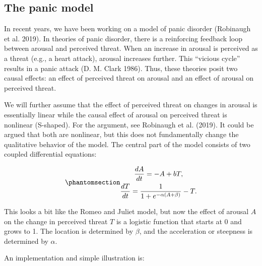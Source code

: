\documentclass[
  a4paper,
  DIV=11,
  numbers=noendperiod,
  oneside]{scrreprt}
\begin{document}
\subsection{The panic model}\label{sec-The-panic-model}

In recent years, we have been working on a model of panic disorder
(Robinaugh et al. 2019). In theories of panic disorder, there is a
reinforcing feedback loop between arousal and perceived threat. When an
increase in arousal is perceived as a threat (e.g., a heart attack),
arousal increases further. This ``vicious cycle'' results in a panic
attack (D. M. Clark 1986). Thus, these theories posit two causal
effects: an effect of perceived threat on arousal and an effect of
arousal on perceived threat.

We will further assume that the effect of perceived threat on changes in
arousal is essentially linear while the causal effect of arousal on
perceived threat is nonlinear (S-shaped). For the argument, see
Robinaugh et al. (2019). It could be argued that both are nonlinear, but
this does not fundamentally change the qualitative behavior of the
model. The central part of the model consists of two coupled
differential equations:

\begin{equation}\phantomsection\label{eq-ch4n-14-old-34}{
\begin{gathered}
\frac{dA}{dt} = - A + bT, \\
\frac{dT}{dt} = \frac{1}{1 + e^{- \alpha(A + \beta)}} - T.
\end{gathered}
}\end{equation}

This looks a bit like the Romeo and Juliet model, but now the effect of
arousal \(A\) on the change in perceived threat \(T\) is a logistic
function that starts at 0 and grows to 1. The location is determined by
\(\beta\), and the acceleration or steepness is determined by
\(\alpha\).

An implementation and simple illustration is:
\end{document}
